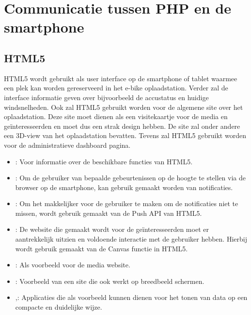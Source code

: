 \section{Communicatie tussen PHP en de smartphone}

\subsection{HTML5}

HTML5 wordt gebruikt als user interface op de smartphone of tablet waarmee een plek kan worden gereserveerd in het e-bike oplaadstation. Verder zal de interface informatie geven over bijvoorbeeld de accustatus en huidige windsnelheden. Ook zal HTML5 gebruikt worden voor de algemene site over het oplaadstation. Deze site moet dienen als een visitekaartje voor de media en ge\"interesseerden en moet dus een strak design hebben. De site zal onder andere een 3D-view van het oplaadstation bevatten. Tevens zal HTML5 gebruikt worden voor de administratieve dashboard pagina.

\begin{itemize}

\item
\cite{HTML5_manual}: Voor informatie over de beschikbare functies van HTML5.

\item
\cite{HTML5_notifications}: Om de gebruiker van bepaalde gebeurtenissen op de hoogte te stellen via de browser op de smartphone, kan gebruik gemaakt worden van notificaties.

\item
\cite{HTML5_push_api}: Om het makkelijker voor de gebruiker te maken om de notificaties niet te missen, wordt gebruik gemaakt van de Push API van HTML5.

\item
\cite{HTML5_canvas}: De website die gemaakt wordt voor de ge\"interesseerden moet er aantrekkelijk uitzien en voldoende interactie met de gebruiker hebben. Hierbij wordt gebruik gemaakt van de Canvas functie in HTML5.

\item
\cite{HTML5_main_voorbeeld_1}: Als voorbeeld voor de media website.

\item
\cite{HTML5_main_voorbeeld_2}: Voorbeeld van een site die ook werkt op breedbeeld schermen.

\item
\cite{HTML5_app_voorbeeld_1},\cite{HTML5_app_voorbeeld_2}: Applicaties die als voorbeeld kunnen dienen voor het tonen van data op een compacte en duidelijke wijze.


\end{itemize}



